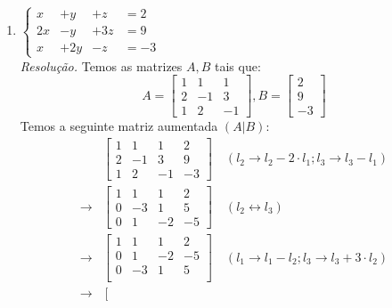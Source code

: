 \begin{enumerate}
    \item $ \left\{\begin{array} {cccc} 
        x & + y & + z & = 2 \\
        2x & - y & + 3z & = 9 \\
        x  & + 2y & - z & = -3
    \end{array} \right. $
    \\ 
    \emph{Resolução.} Temos as matrizes $A, B$ tais que:
    \begin{displaymath}
    A = \left[\begin{array} {ccc} 
        1 & 1 & 1  \\
        2 & -1 & 3\\
        1  & 2 & -1
        \end{array} \right],
    B = \left[\begin{array}{c} 
            2 \\ 
            9 \\ 
            -3 
        \end{array} \right]
    \end{displaymath}
    Temos a seguinte matriz aumentada $(A|B)$:
    \begin{align*}
        &\left[\begin{array} {cccc} 
        1 & 1 & 1 & 2 \\
        2 & -1 & 3 & 9 \\
        1  & 2 & -1 & -3
        \end{array} \right] \quad (l_2 \rightarrow l_2 - 2\cdot l_1; l_3 \rightarrow l_3 - l_1) \\ \rightarrow
        &\left[\begin{array} {cccc} 
        1 & 1 & 1 & 2 \\
        0 & -3 & 1 & 5 \\
        0  & 1 & -2 & -5
        \end{array} \right] \quad (l_2 \leftrightarrow l_3) \\ \rightarrow
        &\left[\begin{array} {cccc} 
        1 & 1 & 1 & 2 \\
        0  & 1 & -2 & -5 \\
        0 & -3 & 1 & 5 \\
        \end{array} \right] \quad (l_1 \rightarrow l_1 - l_2; l_3 \rightarrow l_3 + 3 \cdot l_2) \\ \rightarrow
        &\left[\begin{array} {cccc} 

\end{array}
\end{align*}
\end{enumerate}

